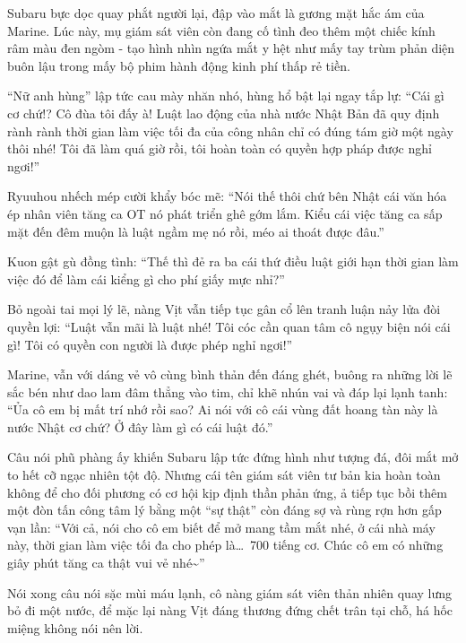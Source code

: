 \documentclass[../main.tex]{subfiles}
\begin{document}

Subaru bực dọc quay phắt người lại, đập vào mắt là gương mặt hắc ám của Marine. Lúc này, mụ giám sát viên còn đang cố tình đeo thêm một chiếc kính râm màu đen ngòm - tạo hình nhìn ngứa mắt y hệt như mấy tay trùm phản diện buôn lậu trong mấy bộ phim hành động kinh phí thấp rẻ tiền.

``Nữ anh hùng'' lập tức cau mày nhăn nhó, hùng hổ bật lại ngay tắp lự: ``Cái gì cơ chứ!? Cô đùa tôi đấy à! Luật lao động của nhà nước Nhật Bản đã quy định rành rành thời gian làm việc tối đa của công nhân chỉ có đúng tám giờ một ngày thôi nhé! Tôi đã làm quá giờ rồi, tôi hoàn toàn có quyền hợp pháp được nghỉ ngơi!''

\il

Ryuuhou nhếch mép cười khẩy bóc mẽ: ``Nói thế thôi chứ bên Nhật cái văn hóa ép nhân viên tăng ca OT nó phát triển ghê gớm lắm. Kiểu cái việc tăng ca sấp mặt đến đêm muộn là luật ngầm mẹ nó rồi, méo ai thoát được đâu.''

Kuon gật gù đồng tình: ``Thế thì đẻ ra ba cái thứ điều luật giới hạn thời gian làm việc đó để làm cái kiểng gì cho phí giấy mực nhỉ?''

\il

Bỏ ngoài tai mọi lý lẽ, nàng Vịt vẫn tiếp tục gân cổ lên tranh luận nảy lửa đòi quyền lợi: ``Luật vẫn mãi là luật nhé! Tôi cóc cần quan tâm cô ngụy biện nói cái gì! Tôi có quyền con người là được phép nghỉ ngơi!''

Marine, vẫn với dáng vẻ vô cùng bình thản đến đáng ghét, buông ra những lời lẽ sắc bén như dao lam đâm thẳng vào tim, chỉ khẽ nhún vai và đáp lại lạnh tanh: ``Ủa cô em bị mất trí nhớ rồi sao? Ai nói với cô cái vùng đất hoang tàn này là nước Nhật cơ chứ? Ở đây làm gì có cái luật đó.''

Câu nói phũ phàng ấy khiến Subaru lập tức đứng hình như tượng đá, đôi mắt mở to hết cỡ ngạc nhiên tột độ. Nhưng cái tên giám sát viên tư bản kia hoàn toàn không để cho đối phương có cơ hội kịp định thần phản ứng, ả tiếp tục bồi thêm một đòn tấn công tâm lý bằng một ``sự thật'' còn đáng sợ và rùng rợn hơn gấp vạn lần: ``Với cả, nói cho cô em biết để mở mang tầm mắt nhé, ở cái nhà máy này, thời gian làm việc tối đa cho phép là\dots\ 700 tiếng cơ. Chúc cô em có những giây phút tăng ca thật vui vẻ nhé\~{}''

Nói xong câu nói sặc mùi máu lạnh, cô nàng giám sát viên thản nhiên quay lưng bỏ đi một nước, để mặc lại nàng Vịt đáng thương đứng chết trân tại chỗ, há hốc miệng không nói nên lời.
\end{document}
